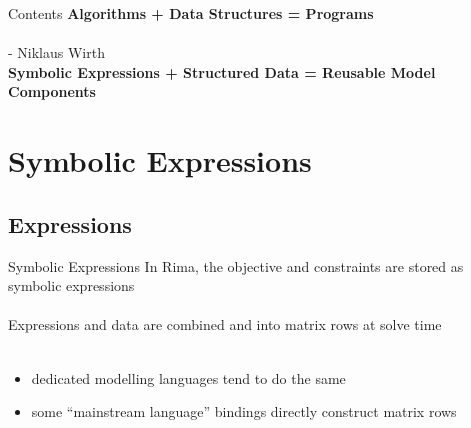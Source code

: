 \documentclass[smaller,handout]{beamer}
\begin{document}
\begin{frame}{Contents}
  \textbf{Algorithms + Data Structures = Programs}\\
  ~\\
  - Niklaus Wirth\\
  \small\textbf{Symbolic Expressions + Structured Data = Reusable Model Components}\\ 
\end{frame}
  






\section{Symbolic Expressions}


\subsection{Expressions}
\begin{frame}{Symbolic Expressions}
  In Rima, the objective and constraints are stored as symbolic expressions\\
  ~\\
  Expressions and data are combined and into matrix rows at solve time
  \\
  ~\\
  \begin{itemize}
    \item dedicated modelling languages tend to do the same
    \item some ``mainstream language'' bindings directly construct matrix rows
 \end{itemize}
\end{frame}
\end{document}
